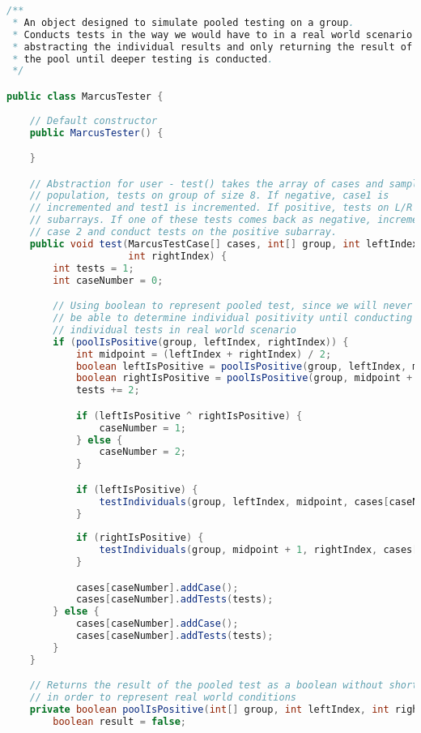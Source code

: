 \documentclass[letterpaper, 10pt]{article}
\begin{document}
\begin{lstlisting}[language=Java, firstnumber=1]
/**
 * An object designed to simulate pooled testing on a group.
 * Conducts tests in the way we would have to in a real world scenario -
 * abstracting the individual results and only returning the result of
 * the pool until deeper testing is conducted.
 */

public class MarcusTester {
    
    // Default constructor
    public MarcusTester() {

    }

    // Abstraction for user - test() takes the array of cases and sample of
    // population, tests on group of size 8. If negative, case1 is
    // incremented and test1 is incremented. If positive, tests on L/R
    // subarrays. If one of these tests comes back as negative, increment
    // case 2 and conduct tests on the positive subarray.
    public void test(MarcusTestCase[] cases, int[] group, int leftIndex,
                     int rightIndex) {
        int tests = 1;
        int caseNumber = 0;

        // Using boolean to represent pooled test, since we will never
        // be able to determine individual positivity until conducting
        // individual tests in real world scenario
        if (poolIsPositive(group, leftIndex, rightIndex)) {
            int midpoint = (leftIndex + rightIndex) / 2;
            boolean leftIsPositive = poolIsPositive(group, leftIndex, midpoint);
            boolean rightIsPositive = poolIsPositive(group, midpoint + 1, rightIndex);
            tests += 2;

            if (leftIsPositive ^ rightIsPositive) {
                caseNumber = 1;
            } else {
                caseNumber = 2;
            }

            if (leftIsPositive) {
                testIndividuals(group, leftIndex, midpoint, cases[caseNumber]);
            }
            
            if (rightIsPositive) {
                testIndividuals(group, midpoint + 1, rightIndex, cases[caseNumber]);
            }

            cases[caseNumber].addCase();
            cases[caseNumber].addTests(tests);
        } else {
            cases[caseNumber].addCase();
            cases[caseNumber].addTests(tests);
        }
    }

    // Returns the result of the pooled test as a boolean without shortcircuiting
    // in order to represent real world conditions
    private boolean poolIsPositive(int[] group, int leftIndex, int rightIndex) {
        boolean result = false;


\end{lstlisting}
\end{document}
